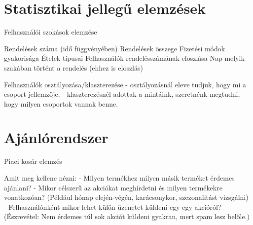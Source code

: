 \section{Statisztikai jellegű elemzések}

Felhasználói szokások elemzése

Rendelések száma (idő függvényében)
Rendelések összege
Fizetési módok gyakorisága
Ételek típusai
Felhasználók rendelésszámának eloszlása
Nap melyik szakában történt a rendelés (ehhez is eloszlás)

Felhasználók osztályozása/klaszterezése
- osztályozásnál eleve tudjuk, hogy mi a csoport jellemzője.
- klaszterezésnél adottak a mintáink, szeretnénk megtudni, hogy milyen csoportok vannak benne.

\section{Ajánlórendszer}

Piaci kosár elemzés

Amit meg kellene nézni:
- Milyen termékhez milyen másik terméket érdemes ajánlani?
- Mikor célszerű az akciókat meghírdetni és milyen termékekre vonatkozóan? (Például hónap elején-végén, karácsonykor, szezonalitást vizsgálni)
- Felhasználónként mikor lehet külön üzenetet küldeni egy-egy akcióról? (Észrevétel: Nem érdemes túl sok akciót küldeni gyakran, mert spam lesz belőle.)
